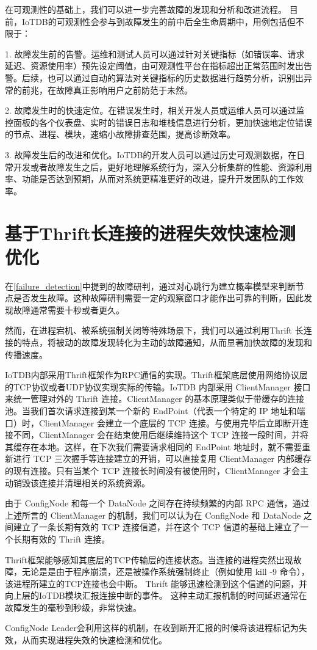 在可观测性的基础上，我们可以进一步完善故障的发现和分析和改进流程。
目前，IoTDB的可观测性会参与到故障发生的前中后全生命周期中，用例包括但不限于：

1. 故障发生前的告警。运维和测试人员可以通过针对关键指标（如错误率、请求延迟、资源使用率）预先设定阈值，由可观测性平台在指标超出正常范围时发出告警。后续，也可以通过自动的算法对关键指标的历史数据进行趋势分析，识别出异常的前兆，在故障真正影响用户之前防范于未然。

2. 故障发生时的快速定位。在错误发生时，相关开发人员或运维人员可以通过监控面板的各个仪表盘、实时的错误日志和堆栈信息进行分析，更加快速地定位错误的节点、进程、模块，速缩小故障排查范围，提高诊断效率。

3. 故障发生后的改进和优化。IoTDB的开发人员可以通过历史可观测数据，在日常开发或者故障发生之后，更好地理解系统行为，深入分析集群的性能、资源利用率、功能是否达到预期，从而对系统更精准更好的改进，提升开发团队的工作效率。


\section{基于Thrift长连接的进程失效快速检测优化}\label{sec:detection-thrift}

在\ref{failure_detection}中提到的故障研判，通过对心跳行为建立概率模型来判断节点是否发生故障。这种故障研判需要一定的观察窗口才能作出可靠的判断，因此发现故障通常需要十秒或者更久。

然而，在进程宕机、被系统强制关闭等特殊场景下，我们可以通过利用Thrift 长连接的特点，将被动的故障发现转化为主动的故障通知，从而显著加快故障的发现和传播速度。

IoTDB内部采用Thrift\cite{slee2007thrift}框架作为RPC通信的实现。Thrift框架底层使用网络协议层的TCP协议或者UDP协议实现实际的传输。IoTDB 内部采用 ClientManager 接口来统一管理对外的 Thrift 连接。ClientManager 的基本原理类似于带缓存的连接池。当我们首次请求连接到某一个新的 EndPoint（代表一个特定的 IP 地址和端口）时，ClientManager 会建立一个底层的 TCP 连接。与使用完毕后立即断开连接不同，ClientManager 会在结束使用后继续维持这个 TCP 连接一段时间，并将其缓存在本地。这样，在下次我们需要请求相同的 EndPoint 地址时，就不需要重新进行 TCP 三次握手等连接建立的开销，可以直接复用 ClientManager 内部缓存的现有连接。只有当某个 TCP 连接长时间没有被使用时，ClientManager 才会主动销毁该连接并清理相关的系统资源。

由于 ConfigNode 和每一个 DataNode 之间存在持续频繁的内部 RPC 通信，通过上述所言的 ClientManager 的机制，我们可以认为在 ConfigNode 和 DataNode 之间建立了一条长期有效的 TCP 连接信道，并在这个 TCP 信道的基础上建立了一个长期有效的 Thrift 连接。

Thrift框架能够感知其底层的TCP传输层的连接状态。当连接的进程突然出现故障，无论是是由于程序崩溃，还是被操作系统强制终止（例如使用 kill -9 命令），该进程所建立的TCP连接也会中断。
Thrift 能够迅速检测到这个信道的问题，并向上层的IoTDB模块汇报连接中断的事件。
这种主动汇报机制的时间延迟通常在故障发生的毫秒到秒级，非常快速。

ConfigNode Leader会利用这样的机制，在收到断开汇报的时候将该进程标记为失效，从而实现进程失效的快速检测和优化。